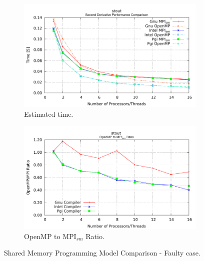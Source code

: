 \begin{figure} [h!]
    \centering
    \captionsetup{justification=centering, singlelinecheck=false}
    \begin{subfigure}{.6\textwidth}
      \centering
      \hspace*{-1.5cm} 
      \includegraphics[width=0.95\linewidth]{Plots/FirstTouch/stoutShowingEffectOfFirstTouch.pdf}
      \caption[]{Estimated time.}
      \label{fig:sharedMemoryComparison}
    \end{subfigure}%
    \begin{subfigure}{.6\textwidth}
      \centering
      \hspace*{-1.5cm} 
      \includegraphics[width=0.95\linewidth]{Plots/FirstTouch/stoutRatioShowingEffectOfFirstTouch.pdf}
      \caption{OpenMP to MPI$_{sm}$ Ratio.}
      \label{fig:sharedMemoryRatioComparison}
    \end{subfigure}%
\caption{Shared Memory Programming Model Comparison - Faulty case.}
\label{fig:sharedMemoryProgrammingModel}
\end{figure}


